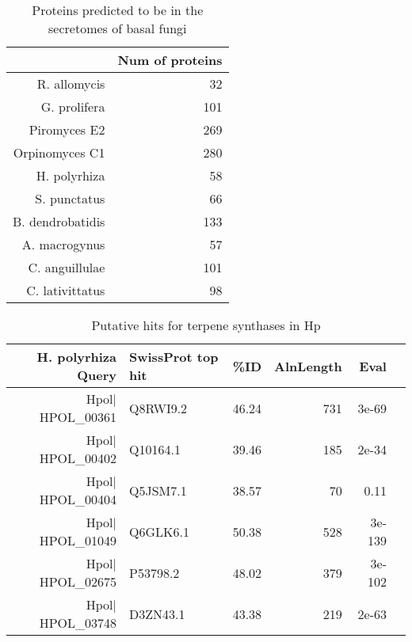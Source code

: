 \begin{table}[ht]
\centering
\caption[Chytrid secretome predictions]{Proteins predicted to be in the secretomes of basal fungi} 
\label{tab:ChInhib_ChySec}
\begin{tabular}{rr}
  \hline
 & Num of proteins \\ 
  \hline
R. allomycis &  32 \\ 
  G. prolifera & 101 \\ 
  Piromyces E2 & 269 \\ 
  Orpinomyces C1 & 280 \\ 
  H. polyrhiza &  58 \\ 
  S. punctatus &  66 \\ 
  B. dendrobatidis & 133 \\ 
  A. macrogynus &  57 \\ 
  C. anguillulae & 101 \\ 
  C. lativittatus &  98 \\ 
   \hline
\end{tabular}
\end{table}
\begin{table}[ht]
\centering
\caption[Putative Hp terpene synthases]{Putative hits for terpene synthases in Hp} 
\label{tab:ChInhib_Terpene}
\begin{tabular}{rlrrrl}
  \hline
 H. polyrhiza Query & SwissProt top hit & \%ID & AlnLength & Eval \\ 
  \hline
Hpol$|$HPOL\_00361 & Q8RWI9.2 & 46.24 & 731 & 3e-69  \\ 
  Hpol$|$HPOL\_00402 & Q10164.1 & 39.46 & 185 & 2e-34  \\ 
  Hpol$|$HPOL\_00404 & Q5JSM7.1 & 38.57 &  70 & 0.11  \\ 
  Hpol$|$HPOL\_01049 & Q6GLK6.1 & 50.38 & 528 & 3e-139  \\ 
  Hpol$|$HPOL\_02675 & P53798.2 & 48.02 & 379 & 3e-102  \\ 
  Hpol$|$HPOL\_03748 & D3ZN43.1 & 43.38 & 219 & 2e-63  \\ 
   \hline
\end{tabular}
\end{table}
